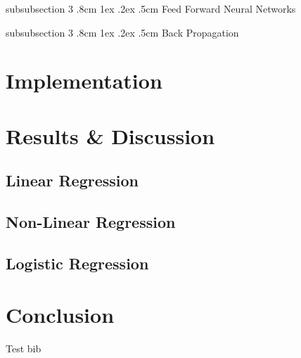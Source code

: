 \documentclass[%
reprint,
amsmath,amssymb,
aps,
]{revtex4-2}
\makeatletter
\renewcommand{\subsubsection}{%
	\@startsection
	{subsubsection}%
	{3}%
	{\z@}%
	{.8cm \@plus1ex \@minus .2ex}%
	{.5cm}%
	{\normalfont\small\centering}%
}
\makeatother
\begin{document}
\subsubsection{Feed Forward Neural Networks}

\subsubsection{Back Propagation}

\section{Implementation}

\section{Results \& Discussion}

\subsection{Linear Regression}

\subsection{Non-Linear Regression}

\subsection{Logistic Regression}


\section{Conclusion}
Test bib \cite{Planck:2018vyg}



	
\end{document}
